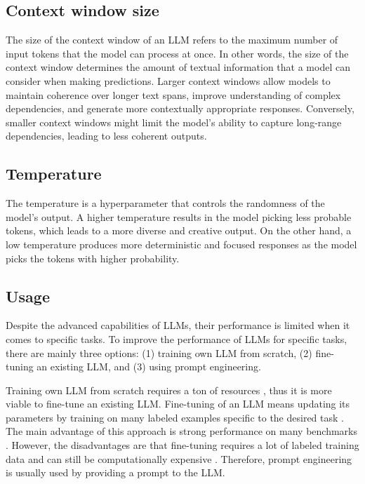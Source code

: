 \subsection{Context window size}

The size of the context window of an LLM refers to the maximum number of input tokens that the model can process at once. In other words, the size of the context window determines the amount of textual information that a model can consider when making predictions. Larger context windows allow models to maintain coherence over longer text spans, improve understanding of complex dependencies, and generate more contextually appropriate responses. Conversely, smaller context windows might limit the model's ability to capture long-range dependencies, leading to less coherent outputs.


\subsection{Temperature}
\label{temperature}

The temperature is a hyperparameter that controls the randomness of the model's output. A higher temperature results in the model picking less probable tokens, which leads to a more diverse and creative output. On the other hand, a low temperature produces more deterministic and focused responses as the model picks the tokens with higher probability.


\subsection{Usage}

Despite the advanced capabilities of LLMs, their performance is limited when it comes to specific tasks. To improve the performance of LLMs for specific tasks, there are mainly three options: (1) training own LLM from scratch, (2) fine-tuning an existing LLM, and (3) using prompt engineering.

Training own LLM from scratch requires a ton of resources \cite{Zhao2023}, thus it is more viable to fine-tune an existing LLM. Fine-tuning of an LLM means updating its parameters by training on many labeled examples specific to the desired task \cite{Brown2020}. The main advantage of this approach is strong performance on many benchmarks \cite{Brown2020}. However, the disadvantages are that fine-tuning requires a lot of labeled training data and can still be computationally expensive \cite{Brown2020}. Therefore, prompt engineering is usually used by providing a prompt to the LLM.


